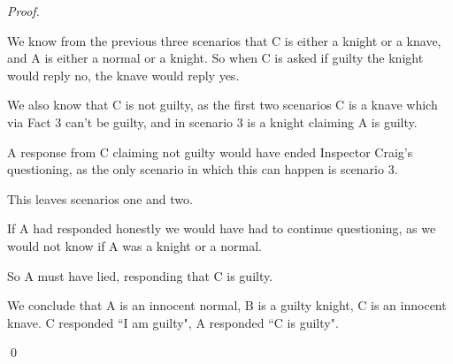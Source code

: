 \documentclass{article}
\begin{document}
\textit{Proof.}
\begin{addmargin}[0.75cm]{0cm}
	We know from the previous three scenarios that C is either a knight or a knave, and A is either a normal or a knight.	So when C is asked if guilty the knight would reply no, the knave would reply yes.
	
	We also know that C is not guilty, as the first two scenarios C is a knave which via Fact 3 can't be guilty, and in scenario 3 is a knight claiming A is guilty.
	
	A response from C claiming not guilty would have ended Inspector Craig's questioning, as the only scenario in which this can happen is scenario 3.
	
	This leaves scenarios one and two.
	
	If A had responded honestly we would have had to continue questioning, as we would not know if A was a knight or a normal.
	
	So A must have lied, responding that C is guilty.
	
	We conclude that A is an innocent normal, B is a guilty knight, C is an innocent knave. C responded ``I am guilty", A responded ``C is guilty".
	
	
	
	\qed
\end{addmargin}
\end{document}
